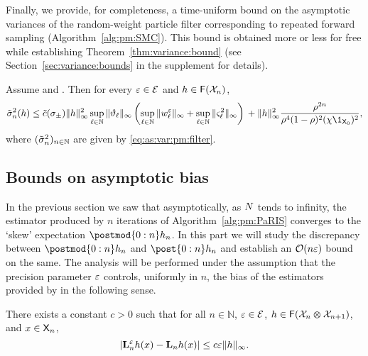 Finally, we provide, for completeness, a time-uniform bound on the asymptotic variances of the random-weight particle filter corresponding to repeated forward sampling (Algorithm~\ref{alg:pm:SMC}). This bound is obtained more or less for free while establishing Theorem~\ref{thm:variance:bound} (see Section~\ref{sec:variance:bounds} in the supplement for details).  

\begin{proposition}  \label{prop:variance:bound:filter}
Assume  and . Then for every $\varepsilon \in \mathcal{E}$ and $h \in \mathsf{F}(\mathcal{X}_n)$,  
$$
\tilde{\sigma}^2_n(h) 
\leq \cboundtd  \|h \|_\infty^2 \sup_{\ell \in \nset} \| \adjfuncforward{\ell} \|_\infty  \left( \sup_{\ell \in \nset} \| \wgtfuncmod{\ell} \|_\infty + \sup_{\ell \in \nset} \| \ukestvar{\ell} \|_\infty \right) \\
+ \| h \|_\infty^2 \frac{\rho^{2n}}{\rho^4(1 - \rho)^2 (\chi \1_{\Xset_0})^2},   
$$
where $(\tilde{\sigma}^2_n)_{n \in \mathbb{N}}$ are given by \eqref{eq:as:var:pm:filter}. 
\end{proposition}

\subsection{Bounds on asymptotic bias}
\label{sec:lipschitz:continuity}

In the previous section we saw that asymptotically, as $N$ tends to infinity, the estimator produced by $n$ iterations of Algorithm~\ref{alg:pm:PaRIS} converges to the `skew' expectation $\postmod{0:n} h_n$. In this part we will study the discrepancy between $\postmod{0:n} h_n$ and $\post{0:n} h_n$ and establish an $\mathcal{O}(n \varepsilon)$ bound on the same. The analysis will be performed under the assumption that the precision parameter $\varepsilon$ controls, uniformly in $n$, the bias of the estimators provided by  in the following sense.    

\begin{hypH}
\label{assum:bias:bound}
There exists a constant $c > 0$ such that for all $n \in \mathbb{N}$, $\varepsilon \in \mathcal{E}$, $h \in \mathsf{F}(\mathcal{X}_n \varotimes \mathcal{X}_{n + 1})$, and $x \in \mathsf{X}_n$,   
$$
|\mathbf{L}_{n}^\varepsilon h (x) - \mathbf{L}_{n} h (x)| \leq c \varepsilon \| h \|_\infty. 
$$
\end{hypH}

